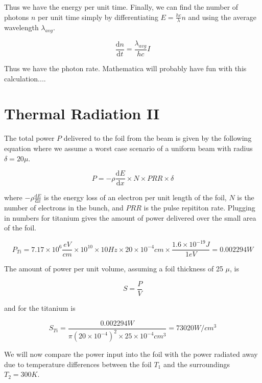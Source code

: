 \documentclass[12pt]{article}
\begin{document}
Thus we have the energy per unit time. Finally, we can find the number of photons $n$ per unit time simply by differentiating $E=\frac{hc}{\lambda} n$ and using the average wavelength $\lambda_{avg}$.

\begin{equation}
\frac{\mathrm{d}n}{\mathrm{d}t}=\frac{\lambda_{avg}}{hc} I
\end{equation}

Thus we have the photon rate. Mathematica will probably have fun with this calculation....

\section{Thermal Radiation II}

The total power $P$ delivered to the foil from the beam is given by the following equation where we assume a worst case scenario of a uniform beam with radius $\delta=20 \mu$.

\begin{equation}
P=-\rho \frac{\mathrm{d} E}{\mathrm{d} x} \times N \times PRR \times \delta
\end{equation}

where $-\rho \frac{\mathrm{d} E}{\mathrm{d} x}$ is the energy loss of an electron per unit length of the foil, $N$ is the number of electrons in the bunch, and $PRR$ is the pulse repititon rate. Plugging in numbers for titanium gives the amount of power delivered over the small area of the foil.

\begin{equation}
P_{Ti}=7.17 \times 10^6 \frac{eV}{cm} \times 10^{10} \times 10 Hz \times 20 \times 10^{-4} cm \times \frac{1.6 \times 10^{-19} J}{1 eV}=0.002294 W
\end{equation}

The amount of power per unit volume, assuming a foil thickness of 25 $\mu$, is

\begin{equation}
S=\frac{P}{V}
\end{equation}

and for the titanium is

\begin{equation}
S_{Ti}=\frac{0.002294 W}{\pi (20 \times 10^{-4})^2 \times 25 \times 10^{-4} cm^3}=73020 W/cm^3
\end{equation}

We will now compare the power input into the foil with the power radiated away due to temperature differences between the foil $T_1$ and the surroundings $T_2=300 K$.
\end{document}
